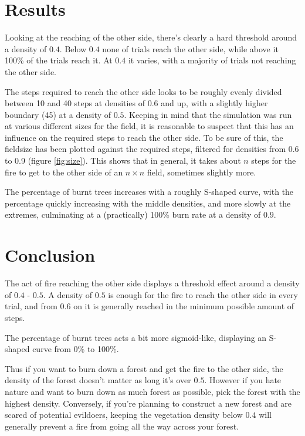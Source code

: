 \documentclass[a4paper]{report}
\begin{document}

\section{Results} 
\label{sec:ff_results}

Looking at the reaching of the other side, there's clearly a hard threshold
around a density of $0.4$. Below $0.4$ none of trials reach the other side, while
above it 100\% of the trials reach it. At $0.4$ it varies, with a majority of
trials not reaching the other side.

The steps required to reach the other side looks to be roughly evenly divided
between 10 and 40 steps at densities of $0.6$ and up, with a slightly higher
boundary (45) at a density of $0.5$. Keeping in mind that the simulation was run
at various different sizes for the field, it is reasonable to suspect that this
has an influence on the required steps to reach the other side. To be sure of
this, the fieldsize has been plotted against the required steps, filtered for
densities from 0.6 to 0.9 (figure \ref{fig:size}). This shows that in general,
it takes about $n$ steps for the fire to get to the other side of an $n \times
n$ field, sometimes slightly more.

The percentage of burnt trees increases with a roughly S-shaped curve, with the
percentage quickly increasing with the middle densities, and more slowly at the
extremes, culminating at a (practically) 100\% burn rate at a density of $0.9$.


\section{Conclusion} 
\label{sec:ff_conc}

The act of fire reaching the other side displays a threshold effect around a
density of $0.4$ - $0.5$. A density of $0.5$ is enough for the fire to reach the
other side in every trial, and from $0.6$ on it is generally reached in the
minimum possible amount of steps.

The percentage of burnt trees acts a bit more sigmoid-like, displaying an
S-shaped curve from 0\% to 100\%.

Thus if you want to burn down a forest and get the fire to the other side, the
density of the forest doesn't matter as long it's over $0.5$. However if you
hate nature and want to burn down as much forest as possible, pick the forest
with the highest density. Conversely, if you're planning to construct a new
forest and are scared of potential evildoers, keeping the vegetation density
below $0.4$ will generally prevent a fire from going all the way across your
forest.
\end{document}
